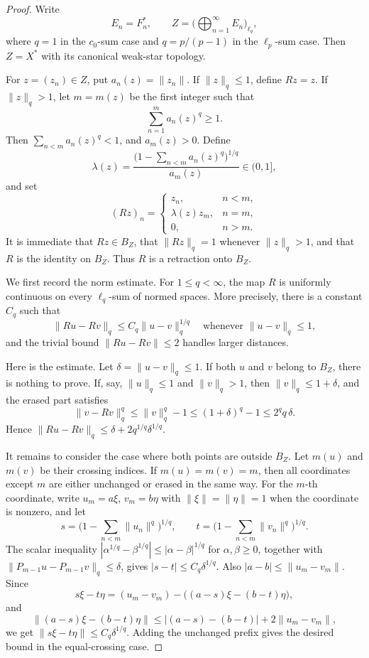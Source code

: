 \documentclass[11pt]{article}
\begin{document}
\begin{proof}
Write
\[
  E_n=F_n^*, \qquad
  Z=\Big(\bigoplus_{n=1}^{\infty}E_n\Big)_{\ell_q},
\]
where \(q=1\) in the \(c_0\)-sum case and \(q=p/(p-1)\) in the
\(\ell_p\)-sum case.  Then \(Z=X^*\) with its canonical weak-star topology.

For \(z=(z_n)\in Z\), put \(a_n(z)=\|z_n\|\).  If \(\|z\|_q\le 1\), define
\(Rz=z\).  If \(\|z\|_q>1\), let \(m=m(z)\) be the first integer such that
\[
  \sum_{n=1}^{m} a_n(z)^q\ge 1.
\]
Then \(\sum_{n<m}a_n(z)^q<1\), and \(a_m(z)>0\).  Define
\[
  \lambda(z)=
  \frac{\bigl(1-\sum_{n<m}a_n(z)^q\bigr)^{1/q}}{a_m(z)}
  \in(0,1],
\]
and set
\[
  (Rz)_n =
  \begin{cases}
  z_n, & n<m,\\
  \lambda(z)z_m, & n=m,\\
  0, & n>m.
  \end{cases}
\]
It is immediate that \(Rz\in B_Z\), that \(\|Rz\|_q=1\) whenever
\(\|z\|_q>1\), and that \(R\) is the identity on \(B_Z\).  Thus \(R\) is a
retraction onto \(B_Z\).

We first record the norm estimate.  For \(1\le q<\infty\), the map \(R\) is
uniformly continuous on every \(\ell_q\)-sum of normed spaces.  More precisely,
there is a constant \(C_q\) such that
\[
  \|Ru-Rv\|_q \le C_q \|u-v\|_q^{1/q}
  \quad\text{whenever } \|u-v\|_q\le 1,
\]
and the trivial bound \(\|Ru-Rv\|\le 2\) handles larger distances.

Here is the estimate.  Let \(\delta=\|u-v\|_q\le 1\).  If both \(u\) and \(v\)
belong to \(B_Z\), there is nothing to prove.  If, say, \(\|u\|_q\le 1\) and
\(\|v\|_q>1\), then \(\|v\|_q\le 1+\delta\), and the erased part satisfies
\[
  \|v-Rv\|_q^q
  \le \|v\|_q^q-1
  \le (1+\delta)^q-1
  \le 2^q q\,\delta .
\]
Hence \(\|Ru-Rv\|_q\le \delta+2q^{1/q}\delta^{1/q}\).

It remains to consider the case where both points are outside \(B_Z\).  Let
\(m(u)\) and \(m(v)\) be their crossing indices.  If \(m(u)=m(v)=m\), then all
coordinates except \(m\) are either unchanged or erased in the same way.  For
the \(m\)-th coordinate, write \(u_m=a\xi\), \(v_m=b\eta\) with
\(\|\xi\|=\|\eta\|=1\) when the coordinate is nonzero, and let
\[
  s=\Big(1-\sum_{n<m}\|u_n\|^q\Big)^{1/q},\qquad
  t=\Big(1-\sum_{n<m}\|v_n\|^q\Big)^{1/q}.
\]
The scalar inequality \(|\alpha^{1/q}-\beta^{1/q}|\le
|\alpha-\beta|^{1/q}\) for \(\alpha,\beta\ge 0\), together with
\(\|P_{m-1}u-P_{m-1}v\|_q\le\delta\), gives \(|s-t|\le C_q\delta^{1/q}\).
Also \(|a-b|\le\|u_m-v_m\|\).  Since
\[
  s\xi-t\eta=(u_m-v_m)-\bigl((a-s)\xi-(b-t)\eta\bigr),
\]
and
\[
  \|(a-s)\xi-(b-t)\eta\|
  \le |(a-s)-(b-t)|+2\|u_m-v_m\|,
\]
we get \(\|s\xi-t\eta\|\le C_q\delta^{1/q}\).  Adding the unchanged prefix
gives the desired bound in the equal-crossing case.


\end{proof}
\end{document}
